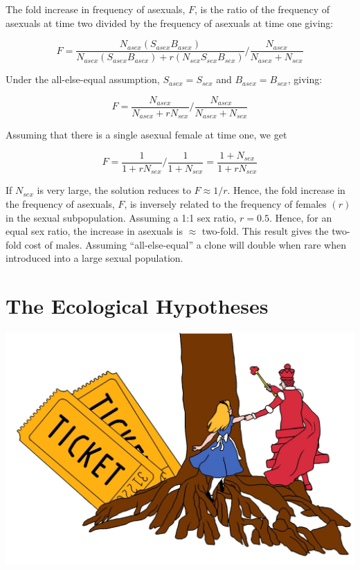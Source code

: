 \documentclass[
  letterpaper,
]{book}
\begin{document}
The fold increase in frequency of asexuals, \(F\), is the ratio of the
frequency of asexuals at time two divided by the frequency of asexuals
at time one giving:

\[F = \frac{N_{asex}(S_{asex}B_{asex})}{N_{asex}(S_{asex}B_{asex}) + r(N_{sex}S_{sex}B_{sex})}/\frac{N_{asex}}{N_{asex} + N_{sex}}\]

Under the all-else-equal assumption, \(S_{asex} = S_{sex}\) and
\(B_{asex} = B_{sex}\), giving:

\[F = \frac{N_{asex}}{N_{asex} + rN_{sex}}/\frac{N_{asex}}{N_{asex} + N_{sex}}\]

Assuming that there is a single asexual female at time one, we get

\[F = \frac{1}{1 + rN_{sex}}/\frac{1}{1 + N_{sex}} = \frac{1 + N_{sex}}{1 + rN_{sex}}\]

If \(N_{sex}\) is very large, the solution reduces to \(F \approx 1/r\).
Hence, the fold increase in the frequency of asexuals, \(F\), is
inversely related to the frequency of females \((r)\) in the sexual
subpopulation. Assuming a 1:1 sex ratio, \(r = 0.5\). Hence, for an
equal sex ratio, the increase in asexuals is \(\approx\) two-fold. This
result gives the two-fold cost of males. Assuming ``all-else-equal'' a
clone will double when rare when introduced into a large sexual
population.


\chapter{The Ecological Hypotheses}\label{sec-eco-hyp}

\begin{center}
\includegraphics{images/fig2-1.jpeg}
\end{center}
\end{document}
